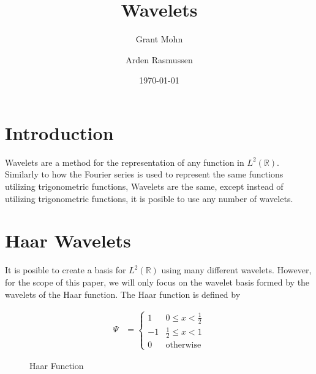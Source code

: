 \documentclass[12pt]{amsart}
\title{Wavelets}
\author{Grant Mohn \and Arden Rasmussen}
\date{\today}
\newcommand{\LP}{L^2(\mathbb{R})}
\begin{document}
\maketitle
{}

\section{Introduction}%
\label{sec:introduction}

Wavelets are a method for the representation of any function in
$\LP$. Similarly to how the Fourier series is used to represent
the same functions utilizing trigonometric functions, Wavelets are the same,
except instead of utilizing trigonometric functions, it is posible to use any
number of wavelets.

\section{Haar Wavelets}%
\label{sec:haar_wavelets}

It is posible to create a basis for $\LP$ using many different
wavelets.  However, for the scope of this paper, we will only focus on the
wavelet basis formed by the wavelets of the Haar function. The Haar function is
defined by

\begin{align}
  \Psi &= \begin{cases} 
    1  & 0\leq x < \frac{1}{2} \\
    -1 & \frac{1}{2} \leq x < 1 \\
    0  & \text{otherwise}
  \end{cases}\label{eq:haar}
\end{align}

\begin{figure}[htpb]
\begin{center}
\end{center}
\caption{Haar Function}
\label{fig:haar_function}
\end{figure}
\end{document}
